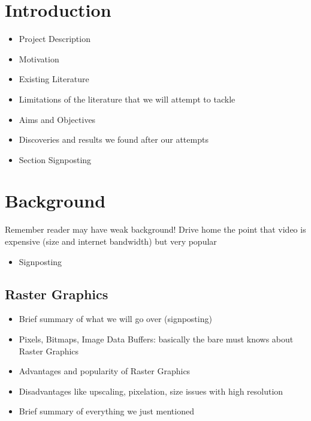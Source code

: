 \documentclass[14pt]{article}
\begin{document}
    \section{Introduction}

    \begin{itemize}
        \item Project Description
        \item Motivation
        \item Existing Literature
        \item Limitations of the literature that we will attempt to tackle
        \item Aims and Objectives
        \item Discoveries and results we found after our attempts
        \item Section Signposting
    \end{itemize}


    \section{Background}

    Remember reader may have weak background!
    \linebreak
    Drive home the point that video is expensive (size and internet bandwidth) but very popular

    \begin{itemize}
        \item Signposting
    \end{itemize}

    \subsection{Raster Graphics}

    \begin{itemize}
        \item Brief summary of what we will go over (signposting)
        \item Pixels, Bitmaps, Image Data Buffers: basically the bare must knows about Raster Graphics
        \item Advantages and popularity of Raster Graphics
        \item Disadvantages like upscaling, pixelation, size issues with high resolution
        \item Brief summary of everything we just mentioned
    \end{itemize}
\end{document}
